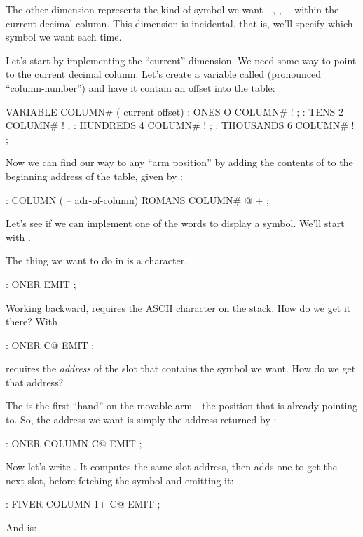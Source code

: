 The other dimension represents the kind of symbol we want---,
, ---within the current decimal column. This
dimension is incidental, that is, we'll specify which symbol we want each
time.

Let's start by implementing the ``current'' dimension. We need
some way to point to the current decimal column. Let's create a variable
called  (pronounced ``column-number'') and have it contain an
offset into the table:

\begin{Code}
VARIABLE COLUMN#  ( current offset)
: ONES        O COLUMN# ! ;
: TENS        2 COLUMN# ! ;
: HUNDREDS    4 COLUMN# ! ;
: THOUSANDS   6 COLUMN# ! ;
\end{Code}
Now we can find our way to any ``arm position'' by adding the contents of
 to the beginning address of the table, given by
:

\begin{Code}
: COLUMN  ( -- adr-of-column)  ROMANS  COLUMN# @  + ;
\end{Code}
Let's see if we can implement one of the words to display a symbol. We'll
start with .

The thing we want to do in  is  a character.

\begin{Code}
: ONER                   EMIT ;
\end{Code}
Working backward,  requires the ASCII character on the stack.
How do we get it there? With .

\begin{Code}
: ONER                C@ EMIT ;
\end{Code}
 requires the \emph{address} of the slot that contains the
symbol we want. How do we get that address?

The  is the first ``hand'' on the movable arm---the position
that  is already pointing to. So, the address we want is
simply the address returned by :

\begin{Code}
: ONER   COLUMN       C@ EMIT ;
\end{Code}
Now let's write . It computes the same slot address, then
adds one to get the next slot, before fetching the symbol and emitting it:

\begin{Code}
: FIVER  COLUMN 1+    C@ EMIT ;
\end{Code}
And  is:


